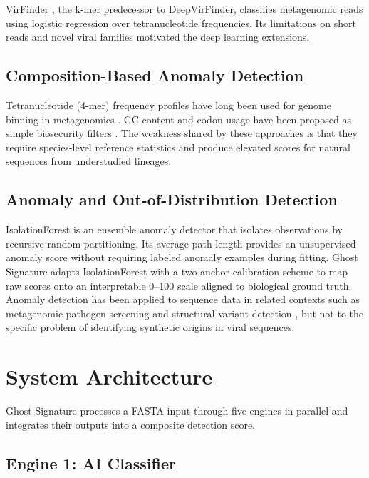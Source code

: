 \documentclass[conference]{IEEEtran}
\begin{document}
VirFinder \cite{ren2017}, the k-mer predecessor to DeepVirFinder, classifies metagenomic reads using logistic regression over tetranucleotide frequencies. Its limitations on short reads and novel viral families motivated the deep learning extensions.

\subsection{Composition-Based Anomaly Detection}

Tetranucleotide (4-mer) frequency profiles have long been used for genome binning in metagenomics \cite{tetra2004}. GC content and codon usage have been proposed as simple biosecurity filters \cite{codon_screen}. The weakness shared by these approaches is that they require species-level reference statistics and produce elevated scores for natural sequences from understudied lineages.

\subsection{Anomaly and Out-of-Distribution Detection}

IsolationForest \cite{liu2008} is an ensemble anomaly detector that isolates observations by recursive random partitioning. Its average path length provides an unsupervised anomaly score without requiring labeled anomaly examples during fitting. Ghost Signature adapts IsolationForest with a two-anchor calibration scheme to map raw scores onto an interpretable 0--100 scale aligned to biological ground truth. Anomaly detection has been applied to sequence data in related contexts such as metagenomic pathogen screening \cite{bartoszewicz2020} and structural variant detection \cite{ostrovsky2020}, but not to the specific problem of identifying synthetic origins in viral sequences.

\section{System Architecture}
\label{sec:system}

Ghost Signature processes a FASTA input through five engines in parallel and integrates their outputs into a composite detection score.

\subsection{Engine 1: AI Classifier}
\end{document}
